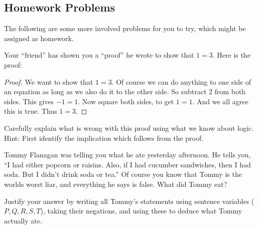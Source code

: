 

\subsection*{Homework Problems}

The following are some more involved problems for you to try, which might be assigned as homework.

\begin{questions}

\question Your ``friend'' has shown you a ``proof'' he wrote to show that $1 = 3$.  Here is the proof:

\begin{proof}
We want to show that $1 = 3$.  Of course we can do anything to one side of an equation as long as we also do it to the other side.  So subtract 2 from both sides.  This gives $-1 = 1$.  Now square both sides, to get $1 = 1$.  And we all agree this is true. Thus $1=3$.
\end{proof}

Carefully explain what is wrong with this proof using what we know about logic.  Hint: First identify the implication which follows from the proof.

%



\question Tommy Flanagan was telling you what he ate yesterday afternoon.  He tells you, ``I had either popcorn or raisins.  Also, if I had cucumber sandwiches, then I had soda.  But I didn't drink soda or tea.''  Of course you know that Tommy is the worlds worst liar, and everything he says is false.  What did Tommy eat?  

Justify your answer by writing all Tommy's statements using sentence variables ($P, Q, R, S, T$), taking their negations, and using these to deduce what Tommy actually ate.


\end{questions}
